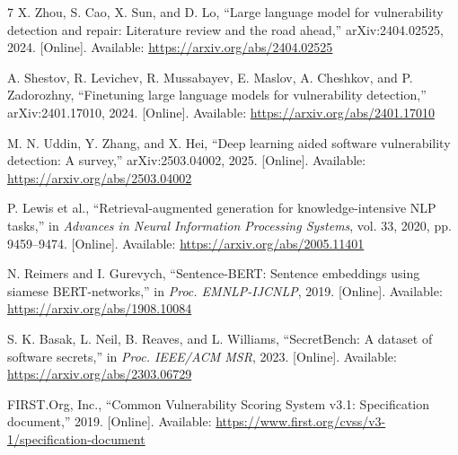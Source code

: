\documentclass[conference,letterpaper]{IEEEtran}
\begin{document}
\begin{thebibliography}{7}
X. Zhou, S. Cao, X. Sun, and D. Lo, ``Large language model for vulnerability detection and repair: Literature review and the road ahead,'' arXiv:2404.02525, 2024. [Online]. Available: \url{https://arxiv.org/abs/2404.02525}

A. Shestov, R. Levichev, R. Mussabayev, E. Maslov, A. Cheshkov, and P. Zadorozhny, ``Finetuning large language models for vulnerability detection,'' arXiv:2401.17010, 2024. [Online]. Available: \url{https://arxiv.org/abs/2401.17010}

M. N. Uddin, Y. Zhang, and X. Hei, ``Deep learning aided software vulnerability detection: A survey,'' arXiv:2503.04002, 2025. [Online]. Available: \url{https://arxiv.org/abs/2503.04002}

P. Lewis et al., ``Retrieval-augmented generation for knowledge-intensive NLP tasks,'' in \emph{Advances in Neural Information Processing Systems}, vol. 33, 2020, pp. 9459--9474. [Online]. Available: \url{https://arxiv.org/abs/2005.11401}

N. Reimers and I. Gurevych, ``Sentence-BERT: Sentence embeddings using siamese BERT-networks,'' in \emph{Proc. EMNLP-IJCNLP}, 2019. [Online]. Available: \url{https://arxiv.org/abs/1908.10084}

S. K. Basak, L. Neil, B. Reaves, and L. Williams, ``SecretBench: A dataset of software secrets,'' in \emph{Proc. IEEE/ACM MSR}, 2023. [Online]. Available: \url{https://arxiv.org/abs/2303.06729}

FIRST.Org, Inc., ``Common Vulnerability Scoring System v3.1: Specification document,'' 2019. [Online]. Available: \url{https://www.first.org/cvss/v3-1/specification-document}
\end{thebibliography}
\end{document}
